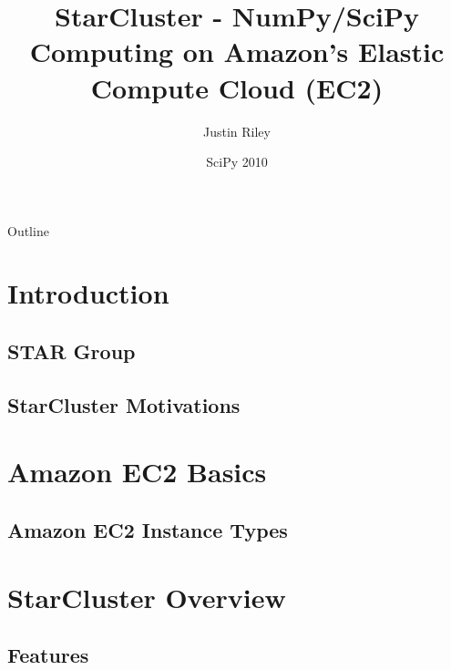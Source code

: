 \documentclass[english,compress]{beamer}
\title{StarCluster - NumPy/SciPy Computing on Amazon's Elastic Compute Cloud (EC2)}
\author{Justin Riley}
\institute[Massachusetts Institute of Technology] %
{
  Software Tools for Academics and Researchers\\
  Office of Educational Innovation and Technology\\
  Massachusetts Institute of Technology}
\date[SciPy 2010]{SciPy 2010}
\begin{document}

\frame{\titlepage}

\section[Outline]{}
\begin{frame}{Outline}
  \tableofcontents
\end{frame}

\section{Introduction}
\subsection{STAR Group}

\subsection{StarCluster Motivations}



\section{Amazon EC2 Basics}
\subsection{Amazon EC2 Instance Types}



\questionframe{}

\section{StarCluster Overview}
\subsection{Features}





\end{document}

